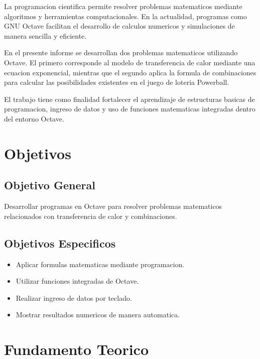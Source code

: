 \documentclass[12pt]{article}
\begin{document}
La programacion cientifica permite resolver problemas matematicos mediante algoritmos y herramientas computacionales. En la actualidad, programas como GNU Octave facilitan el desarrollo de calculos numericos y simulaciones de manera sencilla y eficiente.

En el presente informe se desarrollan dos problemas matematicos utilizando Octave. El primero corresponde al modelo de transferencia de calor mediante una ecuacion exponencial, mientras que el segundo aplica la formula de combinaciones para calcular las posibilidades existentes en el juego de loteria Powerball.

El trabajo tiene como finalidad fortalecer el aprendizaje de estructuras basicas de programacion, ingreso de datos y uso de funciones matematicas integradas dentro del entorno Octave.


\section{Objetivos}

\subsection{Objetivo General}

Desarrollar programas en Octave para resolver problemas matematicos relacionados con transferencia de calor y combinaciones.

\subsection{Objetivos Especificos}

\begin{itemize}
\item Aplicar formulas matematicas mediante programacion.
\item Utilizar funciones integradas de Octave.
\item Realizar ingreso de datos por teclado.
\item Mostrar resultados numericos de manera automatica.
\end{itemize}


\section{Fundamento Teorico}
\end{document}
